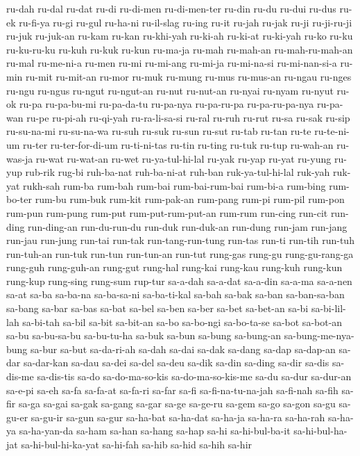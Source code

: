 {ru-dah ru-dal ru-dat ru-di ru-di-men ru-di-men-ter ru-din ru-du ru-dui
ru-dus ru-ek ru-fi-ya ru-gi ru-gul ru-ha-ni ru-il-slag ru-ing ru-it ru-jah
ru-jak ru-ji ru-ji-ru-ji ru-juk ru-juk-an ru-kam ru-kan ru-khi-yah
ru-ki-ah ru-ki-at ru-ki-yah ru-ko ru-ku ru-ku-ru-ku ru-kuh ru-kuk ru-kun
ru-ma-ja ru-mah ru-mah-an ru-mah-ru-mah-an ru-mal ru-me-ni-a ru-men ru-mi
ru-mi-ang ru-mi-ja ru-mi-na-si ru-mi-nan-si-a ru-min ru-mit ru-mit-an
ru-mor ru-muk ru-mung ru-mus ru-mus-an ru-ngau ru-nges ru-ngu ru-ngus
ru-ngut ru-ngut-an ru-nut ru-nut-an ru-nyai ru-nyam ru-nyut ru-ok ru-pa
ru-pa-bu-mi ru-pa-da-tu ru-pa-nya ru-pa-ru-pa ru-pa-ru-pa-nya ru-pa-wan
ru-pe ru-pi-ah ru-qi-yah ru-ra-li-sa-si ru-ral ru-ruh ru-rut ru-sa ru-sak
ru-sip ru-su-na-mi ru-su-na-wa ru-suh ru-suk ru-sun ru-sut ru-tab ru-tan
ru-te ru-te-ni-um ru-ter ru-ter-for-di-um ru-ti-ni-tas ru-tin ru-ting
ru-tuk ru-tup ru-wah-an ru-was-ja ru-wat ru-wat-an ru-wet ru-ya-tul-hi-lal
ru-yak ru-yap ru-yat ru-yung ru-yup rub-rik rug-bi ruh-ba-nat ruh-ba-ni-at
ruh-ban ruk-ya-tul-hi-lal ruk-yah ruk-yat rukh-sah rum-ba rum-bah rum-bai
rum-bai-rum-bai rum-bi-a rum-bing rum-bo-ter rum-bu rum-buk rum-kit
rum-pak-an rum-pang rum-pi rum-pil rum-pon rum-pun rum-pung rum-put
rum-put-rum-put-an rum-rum run-cing run-cit run-ding run-ding-an
run-du-run-du run-duk run-duk-an run-dung run-jam run-jang run-jau
run-jung run-tai run-tak run-tang-run-tung run-tas run-ti run-tih run-tuh
run-tuh-an run-tuk run-tun run-tun-an run-tut rung-gas rung-gu
rung-gu-rang-ga rung-guh rung-guh-an rung-gut rung-hal rung-kai rung-kau
rung-kuh rung-kun rung-kup rung-sing rung-sum rup-tur sa-a-dah sa-a-dat
sa-a-din sa-a-ma sa-a-nen sa-at sa-ba sa-ba-na sa-ba-sa-ni sa-ba-ti-kal
sa-bah sa-bak sa-ban sa-ban-sa-ban sa-bang sa-bar sa-bas sa-bat sa-bel
sa-ben sa-ber sa-bet sa-bet-an sa-bi sa-bi-lil-lah sa-bi-tah sa-bil sa-bit
sa-bit-an sa-bo sa-bo-ngi sa-bo-ta-se sa-bot sa-bot-an sa-bu sa-bu-sa-bu
sa-bu-tu-ha sa-buk sa-bun sa-bung sa-bung-an sa-bung-me-nya-bung sa-bur
sa-but sa-da-ri-ah sa-dah sa-dai sa-dak sa-dang sa-dap sa-dap-an sa-dar
sa-dar-kan sa-dau sa-dei sa-del sa-deu sa-dik sa-din sa-ding sa-dir sa-dis
sa-dis-me sa-dis-tis sa-do sa-do-ma-so-kis sa-do-ma-so-kis-me sa-du sa-dur
sa-dur-an sa-e-pi sa-eh sa-fa sa-fa-at sa-fa-ri sa-far sa-fi
sa-fi-na-tu-na-jah sa-fi-nah sa-fih sa-fir sa-ga sa-gai sa-gak sa-gang
sa-gar sa-ge sa-ge-ru sa-gem sa-go sa-gon sa-gu sa-gu-er sa-gu-ir sa-gun
sa-gur sa-ha-bat sa-ha-dat sa-ha-ja sa-ha-ra sa-ha-rah sa-ha-ya
sa-ha-yan-da sa-ham sa-han sa-hang sa-hap sa-hi sa-hi-bul-ba-it
sa-hi-bul-ha-jat sa-hi-bul-hi-ka-yat sa-hi-fah sa-hib sa-hid sa-hih sa-hir
}
